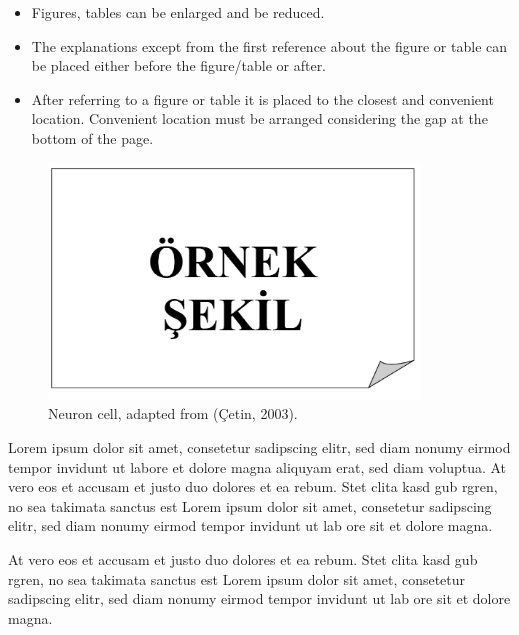 \begin{itemize}
	\setlength{\itemindent}{0em} %
	\item{Figures, tables can be enlarged and be reduced.}
	\vspace{-3mm}
	\item{The explanations except from the first reference about the figure or table can be placed either before the figure/table or after.}
	\vspace{-3mm}
	\item{After referring to a figure or table it is placed to the closest and convenient location. Convenient location must be arranged considering the gap at the bottom of the page.}
\end{itemize}

\begin{figure}
	\centering
	\includegraphics[width=280pt,keepaspectratio=true]{./fig/sekil3}
	\caption{Neuron cell, adapted from (\c{C}etin, 2003).}
	\label{Figure3.1}
\end{figure}

Lorem ipsum dolor sit amet, consetetur sadipscing elitr, sed diam nonumy eirmod tempor invidunt ut labore et dolore magna aliquyam erat, sed diam voluptua. At vero eos et accusam et justo duo dolores et ea rebum. Stet clita kasd gub rgren, no sea takimata sanctus est Lorem ipsum dolor sit amet, consetetur sadipscing elitr, sed diam nonumy eirmod tempor invidunt ut lab ore sit et dolore magna.

At vero eos et accusam et justo duo dolores et ea rebum. Stet clita kasd gub rgren, no sea takimata sanctus est Lorem ipsum dolor sit amet, consetetur sadipscing elitr, sed diam nonumy eirmod tempor invidunt ut lab ore sit et dolore magna.

